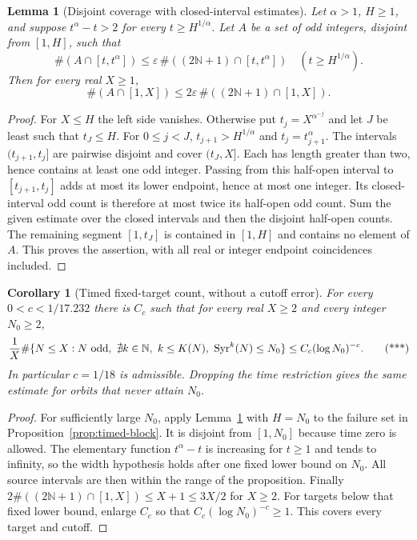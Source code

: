 \documentclass[11pt]{article}
\newtheorem{corollary}[proposition]{Corollary}
\newtheorem{lemma}[proposition]{Lemma}
\theoremstyle{remark}\newtheorem{remark}[proposition]{Remark}
\newcommand{\NN}{\mathbb N}
\newcommand{\Syr}{\operatorname{Syr}}
\begin{document}
\begin{lemma}[Disjoint coverage with closed-interval estimates]
\label{lem:power-cover}
Let $\alpha>1$, $H\ge1$, and suppose
$t^\alpha-t>2$ for every $t\ge H^{1/\alpha}$.
Let $A$ be a set of odd integers, disjoint from $[1,H]$, such that
\[
 \#(A\cap[t,t^\alpha])
       \le\varepsilon\,\#((2\NN+1)\cap[t,t^\alpha])
       \quad(t\ge H^{1/\alpha}).
\]
Then for every real $X\ge1$,
\[
 \#(A\cap[1,X])\le
           2\varepsilon\,\#((2\NN+1)\cap[1,X]).
\]
\end{lemma}
\begin{proof}
For $X\le H$ the left side vanishes. Otherwise put
$t_j=X^{\alpha^{-j}}$ and let $J$ be least such that $t_J\le H$.
For $0\le j<J$, $t_{j+1}>H^{1/\alpha}$ and
$t_j=t_{j+1}^\alpha$.
The intervals $(t_{j+1},t_j]$ are pairwise disjoint and cover
$(t_J,X]$. Each has length greater than two, hence contains at
least one odd integer. Passing from this half-open interval to
$[t_{j+1},t_j]$ adds at most its lower endpoint, hence at most
one integer. Its closed-interval odd count is therefore at most
twice its half-open odd count. Sum the given estimate over the
closed intervals and then the disjoint half-open counts.
The remaining segment $[1,t_J]$ is contained in $[1,H]$ and
contains no element of $A$. This proves the assertion, with
all real or integer endpoint coincidences included.
\end{proof}

\begin{corollary}[Timed fixed-target count, without a cutoff error]
\label{cor:timed-count}
For every $0<c<1/17.232$ there is $C_c$ such that for every real
$X\ge2$ and every integer $N_0\ge2$,
\[
 \frac1X\#\{N\le X:N\ {\rm odd},\
       \nexists k\in\NN,\ k\le K(N),\ \Syr^k(N)\le N_0\}
          \le C_c(\log N_0)^{-c}.                      \tag{***}
\]
In particular $c=1/18$ is admissible. Dropping the time restriction
gives the same estimate for orbits that never attain $N_0$.
\end{corollary}
\begin{proof}
For sufficiently large $N_0$, apply Lemma~\ref{lem:power-cover}
with $H=N_0$ to the failure set in Proposition~\ref{prop:timed-block}.
It is disjoint from $[1,N_0]$ because time zero is allowed.
The elementary function $t^\alpha-t$ is increasing for $t\ge1$
and tends to infinity, so the width hypothesis holds after one
fixed lower bound on $N_0$. All source intervals are then within
the range of the proposition. Finally
$2\#((2\NN+1)\cap[1,X])\le X+1\le3X/2$ for $X\ge2$.
For targets below that fixed lower bound, enlarge $C_c$ so that
$C_c(\log N_0)^{-c}\ge1$. This covers every target and cutoff.
\end{proof}
\end{document}
